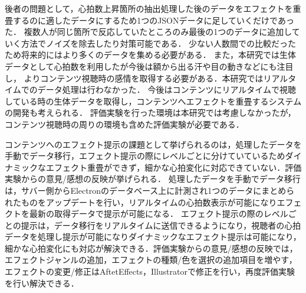 後者の問題として，心拍数上昇箇所の抽出処理した後のデータをエフェクトを重畳するのに適したデータにするため1つのJSONデータに足していくだけであった．
複数人が同じ箇所で反応していたところのみ最後の1つのデータに追加していく方法でノイズを除去したり対策可能である．
少ない人数間での比較だったため将来的にはより多くのデータを集める必要がある．
また，本研究では生体データとして心拍数を利用したが今後は額から出る汗や目の動きなどにも注目し，
よりコンテンツ視聴時の感情を取得する必要がある．本研究ではリアルタイムでのデータ処理は行わなかった．
今後はコンテンツにリアルタイムで視聴している時の生体データを取得し，コンテンツへエフェクトを重畳するシステムの開発も考えられる．
評価実験を行った環境は本研究では考慮しなかったが，コンテンツ視聴時の周りの環境も含めた評価実験が必要である．

コンテンツへのエフェクト提示の課題として挙げられるのは，処理したデータを手動でデータ移行，エフェクト提示の際にレベルごとに分けていているためダイナミックなエフェクト重畳ができず，細かな心拍変化に対応できていない．評価実験からの意見/感想の反映が挙げられる．
処理したデータを手動でデータ移行は，サバー側からElectronのデータベース上に計測され1つのデータにまとめられたものをアップデートを行い，リアルタイムの心拍数表示が可能になりエフェクトを最新の取得データで提示が可能になる．
エフェクト提示の際のレベルごとの提示は，データ移行をリアルタイムに送信できるようになり，視聴者の心拍データを処理し提示が可能になりダイナミックなエフェクト提示は可能になり，細かな心拍変化にも対応が解決できる．評価実験からの意見/感想の反映では，エフェクトジャンルの追加，エフェクトの種類/色を選択の追加項目を増やす，エフェクトの変更/修正はAftetEffects，Illustratorで修正を行い，再度評価実験を行い解決できる．


